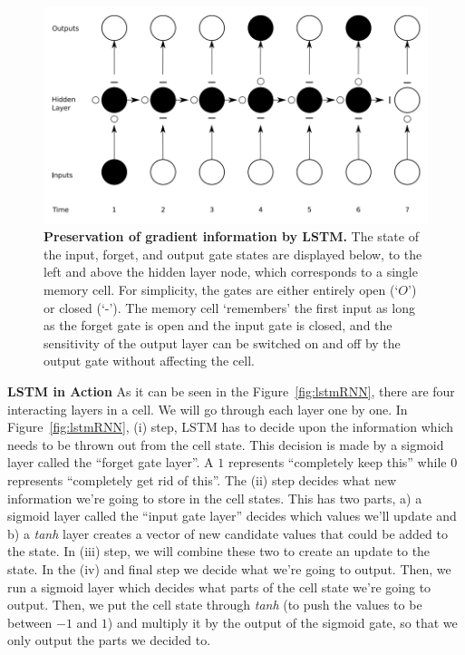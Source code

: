 \begin{figure}[h]
\centering
\includegraphics[scale=0.4]{figures/memoryGates.png}
\caption{\textbf{Preservation of gradient information by \textsc{LSTM}.} The state of the input, forget, and output gate states are displayed below, to the left and above the hidden layer node, which corresponds to a single memory cell. For simplicity, the gates are either entirely open (`$O$') or closed (`-'). The memory cell `remembers' the first input as long as the forget gate is open and the input gate is closed, and the sensitivity of the output layer can be switched on and off by the output gate without affecting the cell.~\cite{gravesThesis}}
\label{fig:memGates}
\end{figure}


\noindent\textbf{\textsc{LSTM} in Action} As it can be seen in the Figure~\ref{fig:lstmRNN}, there are four interacting layers in a cell. We will go through each layer one by one. In Figure~\ref{fig:lstmRNN}, (i) step, \textsc{LSTM} has to decide upon the information which needs to be thrown out from the cell state. This decision is made by a sigmoid layer called the ``forget gate layer''. A $1$ represents ``completely keep this'' while $0$ represents ``completely get rid of this''. The (ii) step decides what new information we're going to store in the cell states. This has two parts, a) a sigmoid layer called the ``input gate layer'' decides which values we'll update and b) a \textit{tanh} layer creates  a vector of new candidate values that could be added to the state. In (iii) step, we will combine these two to create an update to the state. In the (iv) and final step we decide what we're going to output. Then, we run a sigmoid layer which decides what parts of the cell state we’re going to output. Then, we put the cell state through \textit{tanh} (to push the values to be between ${-1}$ and $1$) and multiply it by the output of the sigmoid gate, so that we only output the parts we decided to.    

